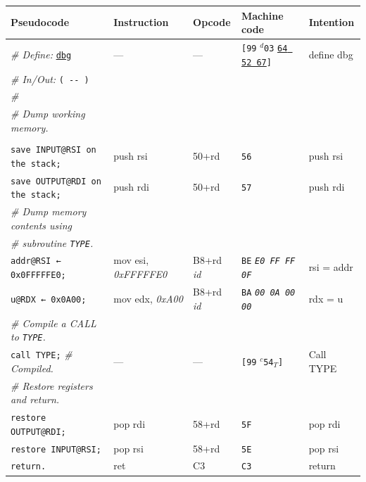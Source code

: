 \documentclass[a4paper,12pt,final]{article}
\begin{document}
\begin{table}[!htbp] \begin{adjustwidth}{-1cm}{-1cm} \fontsize{10}{12.000000}\selectfont
\begin{center}
\begin{tabular}{l|ll|lH}
\textbf{Pseudocode} & \textbf{Instruction} & \textbf{Opcode} & \textbf{Machine code} & \textbf{Intention}\\[0pt]
\hline
\emph{\# Define:} \uline{\texttt{dbg}} & --- & --- & \texttt{[99} \(^{d}\)​\texttt{03} \uline{\texttt{64 52 67}}​\texttt{]}​ & define dbg\\[0pt]
\emph{\# In/Out:} \texttt{( -​- )} &  &  &  & \\[0pt]
\emph{\#} &  &  &  & \\[0pt]
\emph{\# Dump working memory.} &  &  &  & \\[0pt]
 &  &  &  & \\[0pt]
\texttt{save INPUT@RSI on the stack;} & push rsi & 50+rd & \texttt{56} & push rsi\\[0pt]
\texttt{save OUTPUT@RDI on the stack;} & push rdi & 50+rd & \texttt{57} & push rdi\\[0pt]
\emph{\# Dump memory contents using} &  &  &  & \\[0pt]
\emph{\# subroutine \texttt{TYPE}.} &  &  &  & \\[0pt]
\texttt{addr@RSI ← 0x0FFFFFE0;} & mov esi, \emph{0xFFFFFE0} & B8+rd \emph{id} & \texttt{BE} \emph{\texttt{E0 FF FF 0F}} & rsi = addr\\[0pt]
\texttt{u@RDX ← 0x0A00;} & mov edx, \emph{0xA00} & B8+rd \emph{id} & \texttt{BA} \emph{\texttt{00 0A 00 00}} & rdx = u\\[0pt]
\emph{\# Compile a CALL to \texttt{TYPE}.} &  &  &  & \\[0pt]
\texttt{call TYPE;}  \emph{\# Compiled.} & --- & --- & \texttt{[99} \(^{c}\)​\texttt{54}​\(_{T}\)​\texttt{]} & Call TYPE\\[0pt]
\emph{\# Restore registers and return.} &  &  &  & \\[0pt]
\texttt{restore OUTPUT@RDI;} & pop rdi & 58+rd & \texttt{5F} & pop rdi\\[0pt]
\texttt{restore INPUT@RSI;} & pop rsi & 58+rd & \texttt{5E} & pop rsi\\[0pt]
\texttt{return.} & ret & C3 & \texttt{C3} & return\\[0pt]
\end{tabular}

\end{center}
\normalsize \end{adjustwidth} \end{table} \vspace{0}
\end{document}
